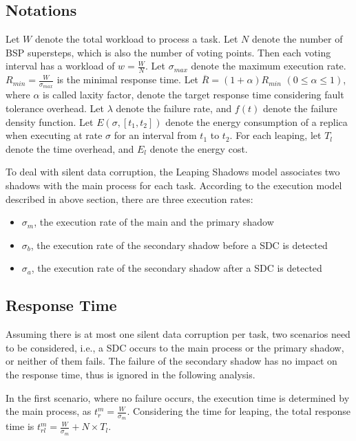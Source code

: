 \subsection{Notations}
Let $W$ denote the total workload to process a task. Let $N$ denote the number of BSP supersteps, which is also the number of voting points. Then each voting interval has a workload of $w=\frac{W}{N}$. Let $\sigma_{max}$ denote the maximum execution rate. $R_{min}=\frac{W}{\sigma_{max}}$ is the minimal response time. Let $\overline{R}=(1+\alpha)R_{min}$ $(0\leq \alpha \leq 1)$, where $\alpha$ is called laxity factor, denote the target response time considering fault tolerance overhead. Let $\lambda$ denote the failure rate, and $f(t)$ denote the failure density function. %
Let $E(\sigma, [t_1, t_2])$ denote the energy consumption of a replica when executing at rate $\sigma$ for an interval from $t_1$ to $t_2$. For each leaping, let $T_l$ denote the time overhead, and $E_l$ denote the energy cost.

To deal with silent data corruption, the Leaping Shadows model associates two shadows with the main process for each task. According to the execution model described in above section, there are three execution rates:
\begin{itemize}
	\item $\sigma_m$, the execution rate of the main and the primary shadow 
    \item $\sigma_b$, the execution rate of the secondary shadow before a SDC is detected 
    \item $\sigma_a$, the execution rate of the secondary shadow after a SDC is detected 
\end{itemize}

\subsection{Response Time}
Assuming there is at most one silent data corruption per task, two scenarios need to be considered, i.e., a SDC occurs to the main process or the primary shadow, or neither of them fails. The failure of the secondary shadow has no impact on the response time, thus is ignored in the following analysis. 

In the first scenario, where no failure occurs, the execution time is determined by the main process, as $t_r^m=\frac{W}{\sigma_m}$. Considering the time for leaping, the total response time is $t_{rl}^m=\frac{W}{\sigma_m} + N \times T_l$.


